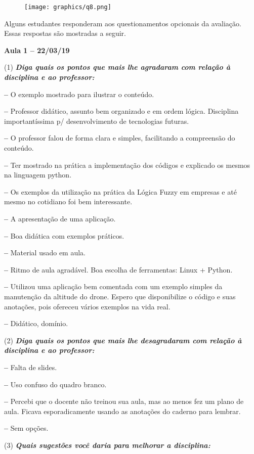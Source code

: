 \documentclass[
	12pt,				%
	openright,			%
	oneside,			%
	a4paper,			%
	chapter=TITLE,		%
	section=TITLE,		%
	english,			%
	french,				%
	spanish,			%
	brazil				%
	]{abntex2}
\begin{document}
\begin{figure}
	\centering
	\texttt{[image: graphics/q8.png]}
\end{figure}

Alguns estudantes responderam aos questionamentos opcionais da avaliação. Essas respostas são mostradas a seguir.

\textbf{Aula 1 -- 22/03/19}

(1) \textit{\textbf{Diga quais os pontos que mais lhe agradaram com relação à disciplina e ao professor:}}

\textbf{--} O exemplo mostrado para ilustrar o conteúdo.

\textbf{--} Professor didático, assunto bem organizado e em ordem lógica. Disciplina importantíssima p/ desenvolvimento de tecnologias futuras.

\textbf{--} O professor falou de forma clara e simples, facilitando a compreensão do conteúdo.

\textbf{--} Ter mostrado na prática a implementação dos códigos e explicado os mesmos na linguagem python.

\textbf{--} Os exemplos da utilização na prática da Lógica Fuzzy em empresas e até mesmo no cotidiano foi bem interessante.

\textbf{--} A apresentação de uma aplicação.

\textbf{--} Boa didática com exemplos práticos.

\textbf{--} Material usado em aula.

\textbf{--} Ritmo de aula agradável. Boa escolha de ferramentas: Linux + Python.

\textbf{--} Utilizou uma aplicação bem comentada com um exemplo simples da manutenção da altitude do drone. Espero que disponibilize o código e suas anotações, pois ofereceu vários exemplos na vida real.

\textbf{--} Didático, domínio.

(2) \textit{\textbf{Diga quais os pontos que mais lhe desagradaram com relação à disciplina e ao professor:}}

\textbf{--} Falta de slides.

\textbf{--} Uso confuso do quadro branco.

\textbf{--} Percebi que o docente não treinou sua aula, mas ao menos fez um plano de aula. Ficava esporadicamente usando as anotações do caderno para lembrar.

\textbf{--} Sem opções.

(3) \textit{\textbf{Quais sugestões você daria para melhorar a disciplina:}}
\end{document}
